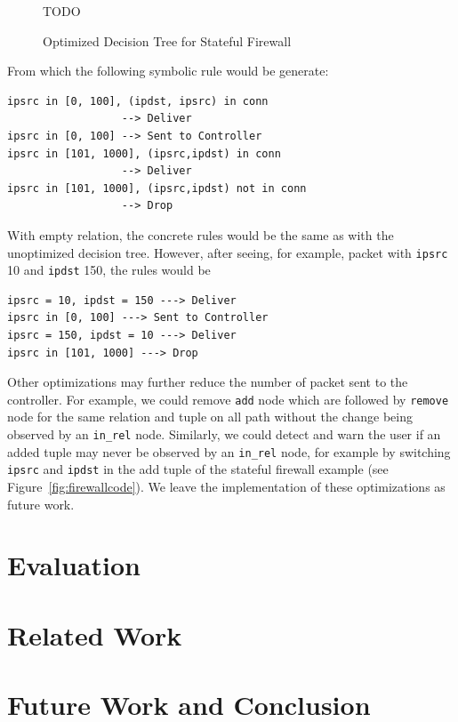 \documentclass[preprint]{sigplanconf}
\begin{document}
\begin{figure}[ht]
  TODO
\caption{Optimized Decision Tree for Stateful Firewall}     
\label{fig:decisiontreeopt}  
  \end{figure}


From which the following symbolic rule would be generate:
\begin{lstlisting}
ipsrc in [0, 100], (ipdst, ipsrc) in conn
                  --> Deliver
ipsrc in [0, 100] --> Sent to Controller
ipsrc in [101, 1000], (ipsrc,ipdst) in conn
                  --> Deliver
ipsrc in [101, 1000], (ipsrc,ipdst) not in conn
                  --> Drop
\end{lstlisting}

With empty relation, the concrete rules would be the same as with the unoptimized decision tree. However, after seeing, for example, packet with \lstinline|ipsrc| 10 and \lstinline|ipdst| 150, the rules would be
\begin{lstlisting}
ipsrc = 10, ipdst = 150 ---> Deliver  
ipsrc in [0, 100] ---> Sent to Controller  
ipsrc = 150, ipdst = 10 ---> Deliver  
ipsrc in [101, 1000] ---> Drop  
\end{lstlisting}


Other optimizations may further reduce the number of packet sent to the controller. For example, we could remove \lstinline|add| node which are followed by \lstinline|remove| node for the same relation and tuple on all path without the change being observed by an \lstinline|in_rel| node. Similarly, we could detect and warn the user if an added tuple may never be observed by an \lstinline|in_rel| node, for example by switching \lstinline|ipsrc| and \lstinline|ipdst| in the add tuple of the stateful firewall example (see Figure~\ref{fig:firewallcode}). We leave the implementation of these optimizations as future work.


\section*{Evaluation}


\section*{Related Work}


\section*{Future Work and Conclusion}




\end{document}
